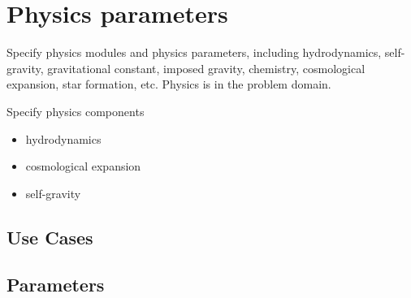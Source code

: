 
\section{Physics parameters} \label{s:physics}

Specify physics modules and physics parameters, including
hydrodynamics, self-gravity, gravitational constant, imposed gravity,
chemistry, cosmological expansion, star formation, etc.  Physics is in
the problem domain.

Specify physics components

\begin{itemize}
\item hydrodynamics
\item  cosmological expansion
\item self-gravity
\end{itemize}

\subsection{Use Cases}
\subsection{Parameters}
